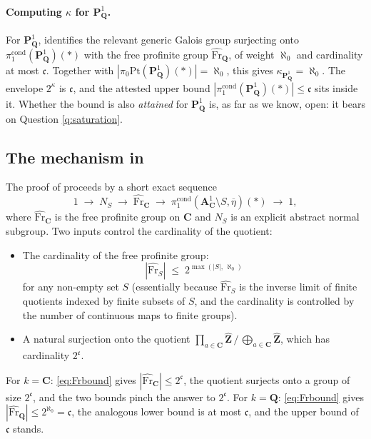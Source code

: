 \documentclass[11pt]{article}
\theoremstyle{definition}
\theoremstyle{plain}
\theoremstyle{remark}
\newcommand{\Pt}{\mathrm{Pt}}
\newcommand{\Frhat}{\widehat{\mathrm{Fr}}}
\newcommand{\Zhat}{\widehat{\mathbf{Z}}}
\newcommand{\Aone}{\mathbf{A}^{1}}
\newcommand{\Pone}{\mathbf{P}^{1}}
\newcommand{\C}{\mathbf{C}}
\newcommand{\Q}{\mathbf{Q}}
\newcommand{\continuum}{\mathfrak{c}}
\begin{document}
\paragraph{Computing $\kappa$ for $\Pone_{\Q}$.}
For $\Pone_{\Q}$, \cite[Remark~7.14]{HHLMMW2025} identifies the relevant
generic Galois group surjecting onto $\pi_1^{\mathrm{cond}}(\Pone_{\Q})(\ast)$
with the free profinite group $\Frhat_{\Q}$, of weight $\aleph_0$ and
cardinality at most $\continuum$. Together with $|\pi_0\Pt(\Pone_{\Q})(\ast)|
= \aleph_0$, this gives $\kappa_{\Pone_{\Q}} = \aleph_0$. The envelope
$2^{\kappa}$ is $\continuum$, and the attested upper bound
$|\pi_1^{\mathrm{cond}}(\Pone_{\Q})(\ast)| \le \continuum$ sits inside it.
Whether the bound is also \emph{attained} for $\Pone_{\Q}$ is, as far as we
know, open: it bears on Question \ref{q:saturation}.

\subsection{The mechanism in \cite{HHLMMW2025}}

The proof of \cite[Proposition 7.2]{HHLMMW2025} proceeds by a short exact
sequence
\begin{equation}\label{eq:ses}
1 \;\to\; N_S \;\to\; \Frhat_{\C} \;\to\;
\pi_1^{\mathrm{cond}}(\Aone_{\C} \setminus S, \overline{\eta})(\ast)
\;\to\; 1,
\end{equation}
where $\Frhat_{\C}$ is the free profinite group on $\C$ and $N_S$ is an
explicit abstract normal subgroup. Two inputs control the cardinality of the
quotient:

\begin{itemize}
\item The cardinality of the free profinite group:
\begin{equation}\label{eq:Frbound}
|\Frhat_{S}| \;\le\; 2^{\max(|S|,\,\aleph_0)}
\end{equation}
for any non-empty set $S$ (essentially because $\Frhat_S$ is the inverse limit
of finite quotients indexed by finite subsets of $S$, and the cardinality is
controlled by the number of continuous maps to finite groups).
\item A natural surjection onto the quotient
$\prod_{a \in \C} \Zhat \,/\, \bigoplus_{a \in \C} \Zhat$, which has
cardinality $2^{\continuum}$.
\end{itemize}

For $k = \C$: \eqref{eq:Frbound} gives $|\Frhat_{\C}| \le 2^{\continuum}$, the
quotient surjects onto a group of size $2^{\continuum}$, and the two bounds
pinch the answer to $2^{\continuum}$. For $k = \Q$: \eqref{eq:Frbound} gives
$|\Frhat_{\Q}| \le 2^{\aleph_0} = \continuum$, the analogous lower bound is at
most $\continuum$, and the upper bound of $\continuum$ stands.
\end{document}
